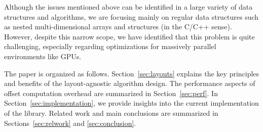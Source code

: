 Although the issues mentioned above can be identified in a large variety of data structures and algorithms, we are focusing mainly on regular data structures such as nested multi-dimensional arrays and structures (in the C/C++ sense). However, despite this narrow scope, we have identified that this problem is quite challenging, especially regarding optimizations for massively parallel environments like GPUs.



The paper is organized as follows. Section~\ref{sec:layouts} explains the key principles and benefits of the layout-agnostic algorithm design. The performance aspects of offset computation overhead are summarized in Section~\ref{sec:perf}. In Section~\ref{sec:implementation}, we provide insights into the current implementation of the \Noarr{} library. Related work and main conclusions are summarized in Sections~\ref{sec:relwork} and \ref{sec:conclusion}.
